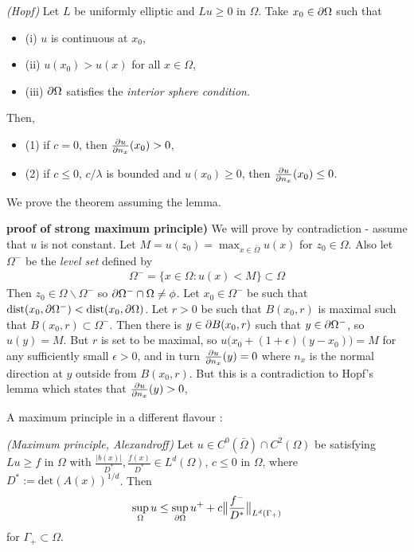 \documentclass[12pt,a4paper]{article}
\newenvironment{proof}
{\begin{changemargin}{0.5cm}{0.5cm} 
	}%
	{\end{changemargin}
}
\renewenvironment{i}
{\begin{itemize} 
	}%
	{\end{itemize}
}
\newenvironment{p}
{\begin{proof} 
	}%
	{\end{proof}
}
\begin{document}
\lem \emph{(Hopf)} Let $L$ be uniformly elliptic and $Lu \geq 0$ in $\Omega$. Take $x_0 \in \partial\Omega$ such that
\begin{i}
\item[(i)] $u$ is continuous at $x_0$,
\item[(ii)] $u(x_0) > u(x)$ for all $x\in \Omega$,
\item[(iii)] $\partial \Omega$ satisfies the \emph{interior sphere condition}.
\end{i}
Then,
\begin{i}
\item[(1)] if $c=0$, then $\frac{\partial u}{\partial n_x} (x_0) >0$,
\item[(2)] if $c\leq 0$, $c/\lambda$ is bounded and $u(x_0) \geq 0$, then $\frac{\partial u}{\partial n_x}(x_0) \leq 0$.
\end{i}
\s

We prove the theorem assuming the lemma.
\s

\begin{p}
\textbf{proof of strong maximum principle)} We will prove by contradiction - assume that $u$ is not constant. Let $M = u(z_0) = \max_{x\in \bar{\Omega}}u(x)$ for $z_0 \in \Omega$. Also let $\Omega^-$ be the \emph{level set} defined by
\begin{align*}
\Omega^- = \{x\in \Omega : u(x) < M  \} \subset \Omega 
\end{align*}
Then $z_0 \in \Omega \backslash \Omega^-$ so $\partial \Omega^- \cap \Omega \neq \phi$. Let $x_0 \in \Omega^-$ be such that $\text{dist}(x_0, \partial \Omega^-) < \text{dist} (x_0, \partial \Omega)$. Let $r>0$ be such that $B(x_0, r)$ is maximal such that $B(x_0, r)\subset \Omega^-$. Then there is $y\in \partial B(x_0, r)$ such that $y\in \partial \Omega^-$, so $u(y) = M$. But $r$ is set to be maximal, so $u\big(x_0 + (1+\epsilon)(y-x_0)\big) =M$ for any sufficiently small $\epsilon >0$, and in turn $\frac{\partial u}{\partial n_x}(y) =0$ where $n_x$ is the normal direction at $y$ outside from $B(x_0, r)$. But this is a contradiction to Hopf's lemma which states that $\frac{\partial u}{\partial n_x}(y)>0$,

\eop
\end{p}
\s

A maximum principle in a different flavour :
\s

\thm \emph{(Maximum principle, Alexandroff)} Let $u \in C^0(\bar{\Omega}) \cap C^2(\Omega)$ be satisfying $Lu \geq f$ in $\Omega$ with $\frac{|b(x)|}{D^*}, \frac{f(x)}{D^*} \in L^d(\Omega)$, $c\leq  0$ in $\Omega$, where $D^* := \text{det}(A(x))^{1/d}$. Then
\begin{align*}
\sup_{\Omega} u \leq \sup_{\partial \Omega} u^+  + c \bigl\lVert\frac{f^-}{D^*}\bigr\rVert_{L^d(\Gamma_+)}
\end{align*}
for $\Gamma_+ \subset \Omega$.
\s
\end{document}
